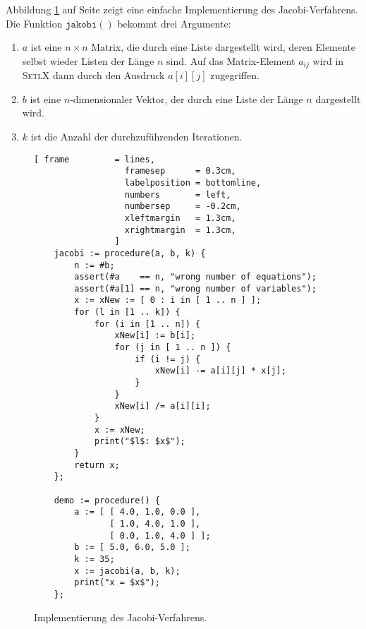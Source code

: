 Abbildung \ref{fig:jacobi-method.stlx} auf Seite \pageref{fig:jacobi-method.stlx} zeigt eine
einfache Implementierung des Jacobi-Verfahrens.   Die Funktion $\texttt{jakobi}()$ bekommt drei
Argumente:
\begin{enumerate}
\item $a$ ist eine $n \times n$ Matrix, die durch eine Liste dargestellt wird, deren
      Elemente selbst wieder Listen der L\"ange $n$ sind.  Auf das Matrix-Element
      $a_{ij}$ wird in \textsc{SetlX} dann durch den Ausdruck $a[i][j]$ zugegriffen. 
\item $b$ ist eine $n$-dimensionaler Vektor, der durch eine Liste der L\"ange $n$ dargestellt
      wird.
\item $k$ ist die Anzahl der durchzuf\"uhrenden Iterationen.
\end{enumerate}

\begin{figure}[!ht]
  \centering
\begin{Verbatim}[ frame         = lines, 
                  framesep      = 0.3cm, 
                  labelposition = bottomline,
                  numbers       = left,
                  numbersep     = -0.2cm,
                  xleftmargin   = 1.3cm,
                  xrightmargin  = 1.3cm,
                ]
    jacobi := procedure(a, b, k) {
        n := #b;
        assert(#a    == n, "wrong number of equations");
        assert(#a[1] == n, "wrong number of variables");
        x := xNew := [ 0 : i in [ 1 .. n ] ];
        for (l in [1 .. k]) {
            for (i in [1 .. n]) {
                xNew[i] := b[i];
                for (j in [ 1 .. n ]) {
                    if (i != j) {
                        xNew[i] -= a[i][j] * x[j];
                    }
                }
                xNew[i] /= a[i][i];
            }
            x := xNew;
            print("$l$: $x$");
        }
        return x;       
    };
    
    demo := procedure() {
        a := [ [ 4.0, 1.0, 0.0 ], 
               [ 1.0, 4.0, 1.0 ],
               [ 0.0, 1.0, 4.0 ] ];
        b := [ 5.0, 6.0, 5.0 ];
        k := 35;  
        x := jacobi(a, b, k);
        print("x = $x$");
    };
\end{Verbatim}
\vspace*{-0.3cm}
  \caption{Implementierung des Jacobi-Verfahrens.}
  \label{fig:jacobi-method.stlx}
\end{figure} %

